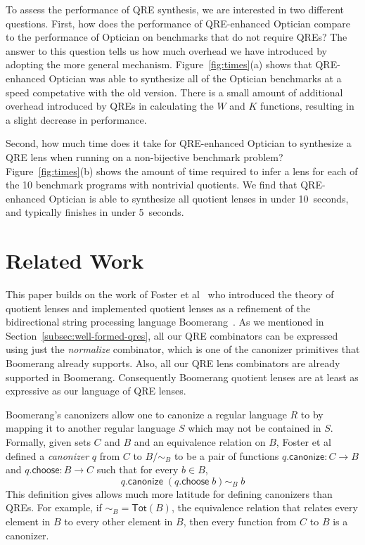 \documentclass[acmsmall,review,anonymous]{acmart}
\newcommand{\codefont}[1]{\ensuremath{\mathsf{#1}}}
\newcommand{\kw}[1]{\codefont{#1}}
\newcommand{\QOpt}{QRE-enhanced Optician}
\begin{document}
To assess the performance of QRE synthesis, we are interested in two different
questions. First, how does the performance of \QOpt{} compare to the performance
of Optician on benchmarks that do not require QREs? The answer to this question
tells us how much overhead we have introduced by adopting the more general
mechanism. Figure~\ref{fig:times}(a) shows that \QOpt{} was able to synthesize
all of the Optician benchmarks at a speed competative with the old version.
There is a small amount of additional overhead introduced by QREs in calculating
the $W$ and $K$ functions, resulting in a slight decrease in performance.

Second, how much time does it take for \QOpt{} to synthesize a QRE
lens when running on a non-bijective benchmark problem?  
Figure~\ref{fig:times}(b) shows the amount of time required to infer a
lens for each of the 10 benchmark programs with nontrivial quotients.  
We find that \QOpt{} is able to synthesize all quotient lenses in
under 10~seconds, and typically finishes in under 5~seconds.

\section{Related Work}
\label{relwork}
This paper builds on the work of Foster et al~\cite{quotientlenses} who
introduced the theory of quotient lenses and implemented quotient lenses as a
refinement of the bidirectional string processing language
Boomerang~\cite{boomerang}. As we mentioned in
Section~\ref{subsec:well-formed-qres}, all our QRE combinators can be expressed
using just the {\em normalize} combinator, which is one of the canonizer
primitives that Boomerang already supports. Also, all our QRE lens combinators
are already supported in Boomerang. Consequently Boomerang quotient lenses are
at least as expressive as our language of QRE lenses. 

Boomerang's canonizers allow one to canonize a regular language $R$ to by
mapping it to another regular language $S$ which may not be contained in $S$.
Formally, given sets $C$ and $B$ and an equivalence relation on $B$, Foster et
al defined a {\em canonizer} $q$ from $C$ to $B/{\sim_B}$ to be a pair of
functions $q.\kw{canonize} : C \longrightarrow B$ and $q.\kw{choose} : B
\longrightarrow C$ such that for every $b \in B$,
$$q.\kw{canonize} \; (q.\kw{choose} \; b) \sim_B \; b$$
This definition gives allows much more latitude for defining canonizers than
QREs. For example, if $\sim_B = \kw{Tot}(B)$, the equivalence relation that
relates every element in $B$ to every other element in $B$, then every function
from $C$ to $B$ is a canonizer.
\end{document}
